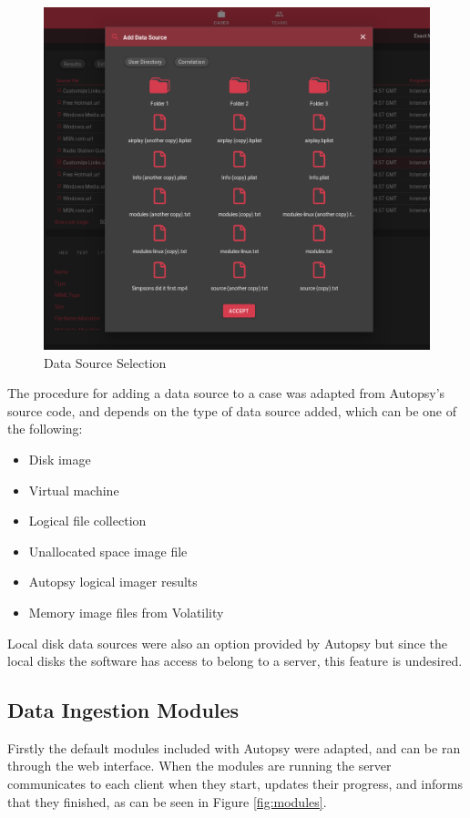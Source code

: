 \begin{figure}[h]
 \centering
 \includegraphics[width=0.85\linewidth]{imgs/data-sources.png}
 \caption{Data Source Selection}
 \label{fig:datasource}
\end{figure}

The procedure for adding a data source to a case was adapted from Autopsy's source code, and depends on the type of data source added, which can be one of the following:
\begin{itemize}
 \item Disk image
 \item Virtual machine
 \item Logical file collection
 \item Unallocated space image file
 \item Autopsy logical imager results
 \item Memory image files from Volatility
\end{itemize}

Local disk data sources were also an option provided by Autopsy but since the local disks the software has access to belong to a server, this feature is undesired.

\subsection{Data Ingestion Modules}

Firstly the default modules included with Autopsy were adapted, and can be ran through the web interface. When the modules are running the server communicates to each client when
they start, updates their progress, and informs that they finished, as can be seen in Figure \ref{fig:modules}.

